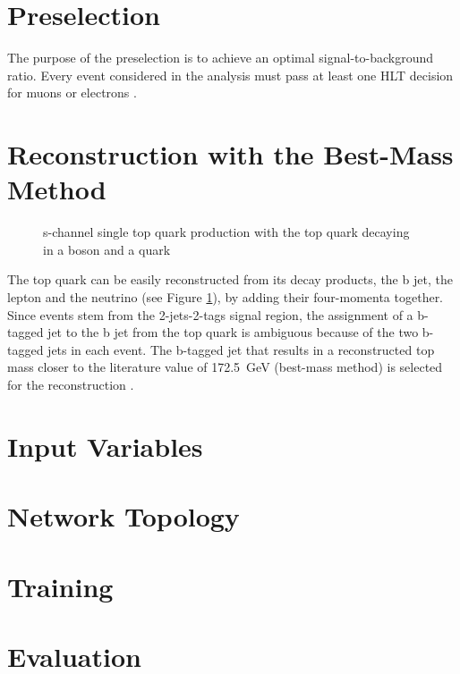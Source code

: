\section{Preselection}
\label{sec:ch-5-preselection}
The purpose of the preselection is to achieve an optimal signal-to-background ratio. Every event considered in the analysis must pass at least one HLT decision for muons or electrons .

\section{Reconstruction with the Best-Mass Method}
\label{sec:ch-5-best-mass}
\begin{figure}[h]
    \centering
    
    \caption{s-channel single top quark production with the top quark decaying in a \PWplus boson and a \Pbottom quark}
    \label{fig:ch_4_single_top_reco}
\end{figure}
The top quark can be easily reconstructed from its decay products, the b jet, the lepton and the neutrino (see Figure \ref{fig:ch_4_single_top_reco}), by adding their four-momenta together. Since events stem from the 2-jets-2-tags signal region, the assignment of a b-tagged jet to the b jet from the top quark is ambiguous because of the two b-tagged jets in each event. The b-tagged jet that results in a reconstructed top mass closer to the literature value of \SI{172.5}{GeV} (best-mass method) is selected for the reconstruction \cite{Fal18}.
\section{Input Variables}
\section{Network Topology}
\section{Training}
\section{Evaluation}

